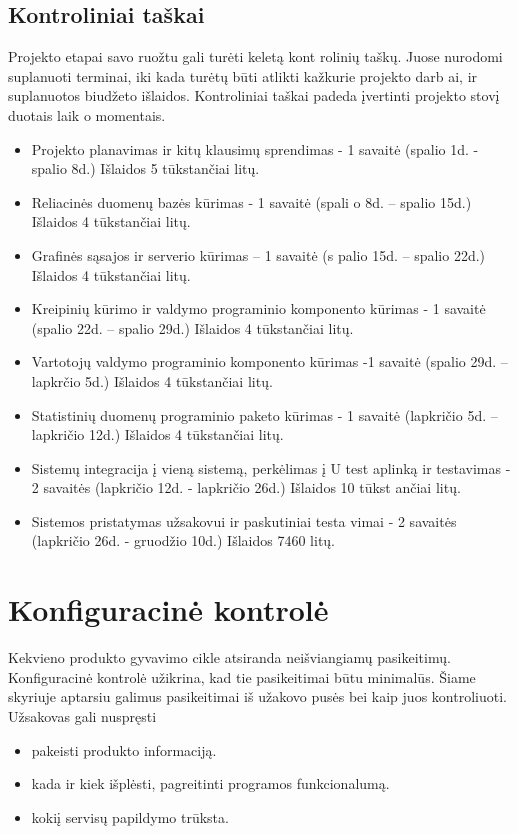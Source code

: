 \documentclass[a4paper,12pt]{article}
\begin{document}
 
\subsection{Kontroliniai taškai}
Projekto etapai savo ruožtu gali turėti keletą kont
rolinių taškų. Juose nurodomi suplanuoti terminai, 
iki kada turėtų būti atlikti kažkurie projekto darb
ai, ir suplanuotos biudžeto išlaidos. Kontroliniai 
taškai padeda įvertinti projekto stovį duotais laik
o momentais. 
\begin{itemize}
\item
Projekto planavimas ir kitų klausimų sprendimas - 1
 savaitė (spalio 1d. - spalio 8d.) Išlaidos 
5 tūkstančiai litų. 
\item
Reliacinės duomenų bazės kūrimas - 1 savaitė (spali
o 8d. – spalio 15d.) Išlaidos 4 
tūkstančiai litų. 
\item
Grafinės sąsajos ir serverio kūrimas – 1 savaitė (s
palio 15d. – spalio 22d.) Išlaidos 4 
tūkstančiai litų. 
\item
Kreipinių kūrimo ir valdymo programinio komponento 
kūrimas -  1 savaitė (spalio 22d. – 
spalio 29d.) Išlaidos 4 tūkstančiai litų. 
\item
Vartotojų valdymo programinio komponento kūrimas -1
 savaitė (spalio 29d. – lapkrčio 5d.) 
Išlaidos 4 tūkstančiai litų. 
\item
Statistinių duomenų programinio paketo kūrimas -  1
 savaitė (lapkričio 5d. – lapkričio 12d.) 
Išlaidos 4 tūkstančiai litų. 
\item
Sistemų integracija į vieną sistemą, perkėlimas į U
test aplinką ir testavimas - 2 savaitės 
(lapkričio 12d. - lapkričio 26d.) Išlaidos 10 tūkst
ančiai litų. 
	\item Sistemos pristatymas užsakovui ir paskutiniai testa
vimai - 2 savaitės (lapkričio 26d. - 
gruodžio 10d.) Išlaidos 7460 litų. 
\end{itemize}
 


\section{Konfiguracin\. e kontrol\. e}
Kekvieno produkto gyvavimo cikle atsiranda nei\v sviangiam\k u pasikeitim\k u.\\
Konfiguracin\. e kontrol\. e u\v zikrina, kad tie pasikeitimai b\= utu minimal\= us.
\v Siame skyriuje aptarsiu galimus pasikeitimai i\v s u\v zakovo pus\. es bei kaip juos kontroliuoti. \\
U\v zsakovas gali nuspr\k esti
\begin{itemize}
	\item pakeisti produkto informacij\k a.
	\item kada ir kiek i\v spl\. esti, pagreitinti programos funkcionalum\k a.
	\item koki\k i servis\k u papildymo tr\= uksta.
\end{itemize}
\end{document}
